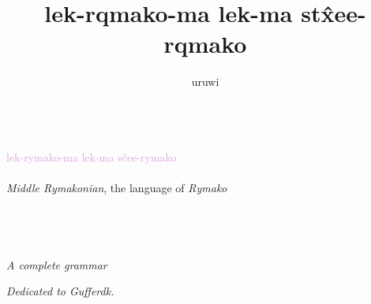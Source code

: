 \documentclass{book}
\title{lek-\bs{}rqmako-ma lek-ma st\^xee-\bs{}rqmako}
\author{uruwi}
\newcommand{\lname}{Middle Rymakonian}
\begin{document}
\pagecolor{Thistle!25}

\begin{titlepage}
    \makeatletter
    \begin{center}
        {\color{Orchid} \hprule \vspace{1.5ex} \\}
        {\Huge \nedham \textcolor{Plum}{lek-\bs{}rymako-ma lek-ma sčee-\bs{}rymako}\\}
        {\large \kardinal \textcolor{Purple}{\@title} \\}
        {\large \textit{\lname}, the language of \textit{Rymako} \\}
        {\color{Orchid} \hprule \vspace{1.5ex} \\}
        \vspace{1.5cm}
        {\Large\bfseries \@author}\\[5pt]
        \vspace{2cm}
        {\Large{}} \\
         \\[5pt]
        \emph{A complete grammar}\\[2cm]
        \vfill
        \vfill
        {\@date}
    \end{center}
    \makeatother
\end{titlepage}

\pagecolor{Thistle!15}

\begin{center}
    \textit{Dedicated to Gufferdk.}
\end{center}
\end{document}
